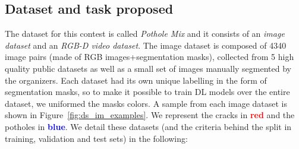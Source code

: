 \documentclass[twocolumn]{article}
\begin{document}
\subsection{Dataset and task proposed}
\label{sec:dataset}
The dataset for this contest is called \emph{Pothole Mix} and it consists of an \emph{image dataset} and an \emph{RGB-D video dataset}. The image dataset is composed of 4340 image pairs (made of RGB images+segmentation masks), collected from 5 high quality public datasets as well as a small set of images manually segmented by the organizers. Each dataset had its own unique labelling in the form of segmentation masks, so to make it possible to train DL models over the entire dataset, we uniformed the masks colors. A sample from each image dataset is shown in Figure~\ref{fig:ds_im_examples}. We represent the cracks in \textcolor{red}{\textbf{red}} and the potholes in \textcolor{blue}{\textbf{blue}}. We detail these datasets (and the criteria behind the split in training, validation and test sets) in the following:
\end{document}
